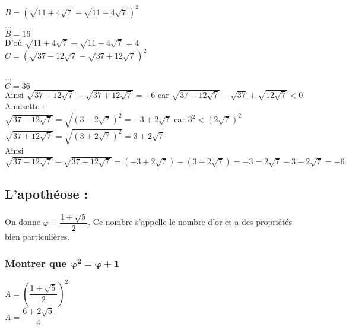 $ B = \left(\sqrt{11+4\sqrt{7}} - \sqrt{11-4\sqrt{7}}\right)^2 $ \\

... \\

$ B = 16 $ \\

D'où $ \sqrt{11+4\sqrt{7}} - \sqrt{11-4\sqrt{7}} = 4 $ \\

$ C = \left(\sqrt{37-12\sqrt{7}} - \sqrt{37 + 12\sqrt{7}} \right)^2 $

... \\

$ C = 36 $ \\

Ainsi $ \sqrt{37-12\sqrt{7}} - \sqrt{37+12\sqrt{7}} = -6 $ car $ \sqrt{37-12\sqrt{7}} - \sqrt{37} +\sqrt{12\sqrt{7}} < 0 $ \\

\underline{Amusette :} \\

$ \sqrt{37-12\sqrt{7}} = \sqrt{\left(3-2\sqrt{7}\right)^2} = -3 + 2\sqrt{7} $ car $ 3^2 < \left(2\sqrt{7}\right)^2 $ \\

$ \sqrt{37 + 12\sqrt{7}} = \sqrt{\left(3 + 2\sqrt{7}\right)^2} = 3+2\sqrt{7} $ \\

 Ainsi $ \sqrt{37-12\sqrt{7}} - \sqrt{37+12\sqrt{7}} = \left(-3 + 2\sqrt{7}\right) -\left(3+2\sqrt{7}\right) = -3 = 2\sqrt{7} -3 -2\sqrt{7} = -6 $ \\
 
\newpage

\subsection{L'apothéose :}

On donne $ \varphi = \dfrac{1+\sqrt{5}}{2} $. Ce nombre s'appelle le nombre d'or et a des propriétés bien particulières. \\

\subsubsection{Montrer que $\mathbf{\varphi^2 = \varphi + 1 }$}

$ A = \left(\dfrac{1+\sqrt{5}}{2}\right)^2 $ \\

$ A = \dfrac{6 + 2\sqrt{5}}{4} $ \\

